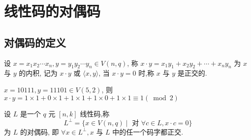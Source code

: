 \section{线性码的对偶码}
\subsection{对偶码的定义}
\begin{definition}[内积]
    设 $ x=x_{1} x_{2} \cdots x_{n}, y=y_{1} y_{2} \cdots y_{n} \in V(n, q) $,
称 $ x \cdot y=x_{1} y_{1}+x_{2} y_{2}+\cdots+x_{n} y_{n} $ 为 $ x $ 与 $ y $ 的内积, 记为 $ x \cdot y $ 或 $ \langle x, y\rangle $, 当 $ x \cdot y=0 $ 时,称 $ x $ 与 $ y $ 是正交的.
\end{definition}


\begin{example}
    $ x=10111, y=11101 \in V(5,2) $,
则 $ x \cdot y=1 \times 1+0 \times 1+1 \times 1+1 \times 0+1 \times 1 \equiv 1(\bmod 2) $
\end{example}

\begin{definition}[对偶码]
    设 $ L $ 是一个 $ q $ 元 $ [n, k] $ 线性码,称
$$
L^{\perp}=\{x \in V(n, q) \mid \text { 对 } \forall c \in L, x \cdot c=0\}
$$
为 $ L $ 的对偶码, 即 $ \forall x \in L^{\perp}, x $ 与 $ L $ 中的任一个码字都正交.
\end{definition}

